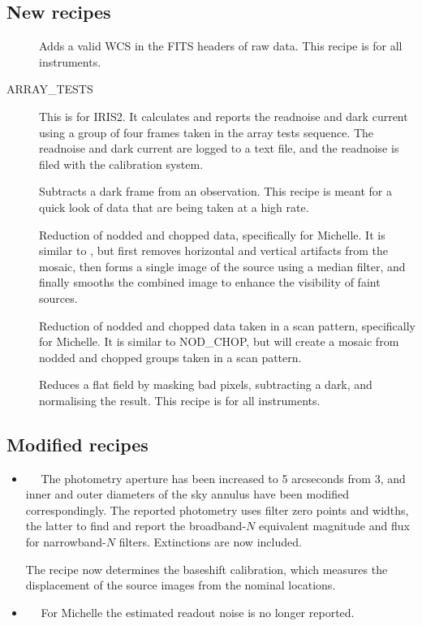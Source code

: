 \documentclass[twoside,11pt,nolof]{starlink}
\begin{document}
\subsection{New recipes}
\begin{description}
  \item []
    Adds a valid WCS in the FITS headers of raw data.  This recipe
    is for all instruments.
  \item [ARRAY\_TESTS]
    This is for IRIS2.  It calculates and reports the readnoise and
    dark current using a group of four frames taken in the array
    tests sequence.  The readnoise and dark current are logged to
    a text file, and the readnoise is filed with the calibration system.
  \item []
    Subtracts a dark frame from an observation.  This recipe is meant
    for a quick look of data that are being taken at a high rate.
  \item []
    Reduction of nodded and chopped data, specifically for Michelle.
    It is similar to , but first removes
    horizontal and vertical artifacts from the mosaic, then forms a single
    image of the source using a median filter, and finally smooths the
    combined image to enhance the visibility of faint sources.
  \item []
    Reduction of nodded and chopped data taken in a scan pattern,
    specifically for Michelle.  It is similar to NOD\_CHOP, but will
    create a mosaic from nodded and chopped groups taken in a scan
    pattern.
  \item []
    Reduces a flat field by masking bad pixels, subtracting a dark,
    and normalising the result.  This recipe is for all instruments.
\end{description}

\subsection{Modified recipes}
\begin{itemize}
  \item {}~~
    The photometry aperture has been increased to 5 arcseconds from 3,
    and inner and outer diameters of the sky annulus have been modified
    correspondingly.  The reported photometry uses filter zero points
    and widths, the latter to find and report the broadband-$N$
    equivalent magnitude and flux for narrowband-$N$ filters.
    Extinctions are now included.

    The recipe now determines the baseshift calibration, which
    measures the displacement of the source images from the nominal
    locations.

  \item {}~~
    For Michelle the estimated readout noise is no longer reported.
\end{itemize}
\end{document}
